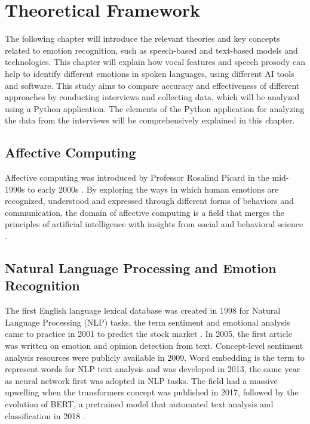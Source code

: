 \chapter{Theoretical Framework}
\label{chap:theoretical-framework}

The following chapter will introduce the relevant theories and key concepts related to emotion recognition, such as speech-based and text-based models and technologies. 
This chapter will explain how vocal features and speech prosody can help to identify different emotions in spoken languages, using different AI tools and software. This study aims to compare accuracy and effectiveness of different approaches by conducting interviews and collecting data, which will be analyzed using a Python application. The elements of the Python application for analyzing the data from the interviews will be comprehensively explained in this chapter.

\section{Affective Computing}

 Affective computing was introduced by Professor Rosalind Picard in the mid-1990s to early 2000s \autocite{Tian2022}. By exploring the ways in which human emotions are recognized, understood and expressed through different forms of behaviors and communication, the domain of affective computing is a field that merges the principles of artificial intelligence with insights from social and behavioral science \autocite{Tian2022}.

\section{Natural Language Processing and Emotion Recognition}

The first English language lexical database was created in 1998 for Natural Language Processing (NLP) tasks, the term sentiment and emotional analysis came to practice in 2001 to predict the stock market \autocite{Kusal2023}. In 2005, the first article was written on emotion and opinion detection from text. Concept-level sentiment analysis resources were publicly available in 2009. Word embedding is the term to represent words for NLP text analysis and was developed in 2013, the same year as neural network first was adopted in NLP tasks. The field had a massive upwelling when the transformers concept was published in 2017, followed by the evolution of BERT, a pretrained model that automated text analysis and classification in 2018 \autocite{Kusal2023}. 

